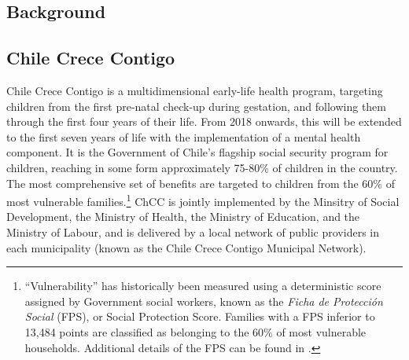 \documentclass[12pt]{article}
\begin{document}
\begin{spacing}{1.4}

\section{Background}
\label{scn:backgroun}
\subsection{Chile Crece Contigo}
\label{sscn:ChCC}
Chile Crece Contigo is a multidimensional early-life health program,
targeting children from the first pre-natal check-up during gestation,
and following them through the first
four years of their life. From 2018 onwards, this will be extended
to the first seven years of life with the implementation of a mental
health component.  It is the Government of Chile's flagship social
security program for children, reaching in some form approximately
75-80\% of children in the country.  The most comprehensive set of
benefits are targeted to children from the 60\% of most vulnerable
families.\footnote{``Vulnerability'' has historically been measured
  using a deterministic score assigned by Government social workers,
  known as the \emph{Ficha de Protecci\'on Social} (FPS), or Social
  Protection Score.  Families with a FPS inferior to 13,484 points are
  classified as belonging to the 60\% of most vulnerable households.
  Additional details of the FPS can be found in \citet{Herreraetal2010}.}
ChCC is jointly implemented by the Minsitry of Social Development, the
Ministry of Health, the Ministry of Education, and the Ministry of
Labour, and is delivered by a local network of public providers in each
municipality (known as the Chile Crece Contigo Municipal Network).


\end{spacing}
\end{document}
